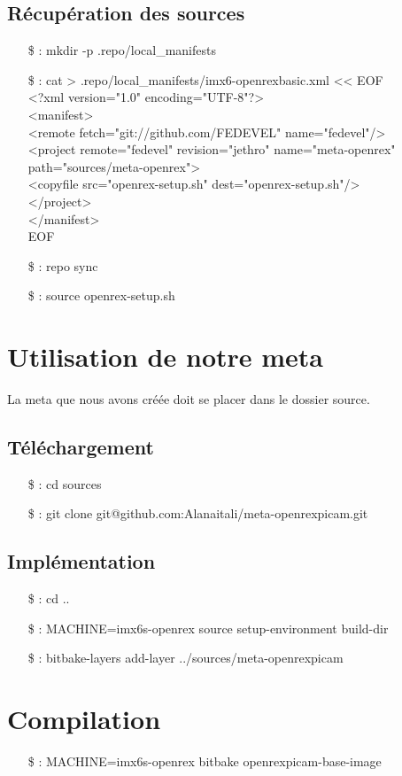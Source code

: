\subsection{Récupération des sources}

\begin{itemize}
    \item[\$ : ] mkdir -p .repo/local\_manifests
    \item[\$ : ] cat > .repo/local\_manifests/imx6-openrexbasic.xml << EOF \\
    <?xml version="1.0" encoding="UTF-8"?> \\
    <manifest> \\
    <remote fetch="git://github.com/FEDEVEL" name="fedevel"/> \\
    <project remote="fedevel" revision="jethro" name="meta-openrex" path="sources/meta-openrex"> \\
    <copyfile src="openrex-setup.sh" dest="openrex-setup.sh"/> \\
    </project> \\
    </manifest> \\
    EOF
    \item[\$ : ] repo sync
    \item[\$ : ] source openrex-setup.sh
\end{itemize}

\section{Utilisation de notre meta}

La meta que nous avons créée doit se placer dans le dossier source.

\subsection{Téléchargement}

\begin{itemize}
    \item[\$ :] cd sources
    \item[\$ :] git clone git@github.com:Alanaitali/meta-openrexpicam.git
\end{itemize}

\subsection{Implémentation}

\begin{itemize}
    \item[\$ :] cd ..
    \item[\$ :] MACHINE=imx6s-openrex source setup-environment build-dir
    \item[\$ :] bitbake-layers add-layer ../sources/meta-openrexpicam
\end{itemize}

\section{Compilation}

\begin{itemize}
    \item[\$ :] MACHINE=imx6s-openrex bitbake openrexpicam-base-image
\end{itemize}
        

